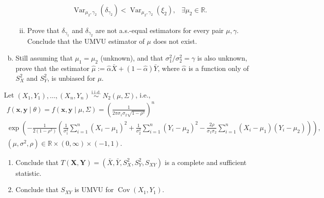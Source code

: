 \begin{ex}
\begin{enumerate}[(a)]
\begin{enumerate}[(i)]
\[\begin{array}{ll}
            \operatorname{Var}_{\mu_{2}, \gamma_{2}}\left(\delta_{\gamma_{2}}\right)<\operatorname{Var}_{\mu_{2}, \gamma_{2}}\left(\xi_{2}\right), & \exists \mu_{2} \in \mathbb{R}. 
            \end{array}
            \]
            \item Prove that \(\delta_{\gamma_{1}}\) and \(\delta_{\gamma_{2}}\) are not a.s.-equal estimators for every pair \(\mu, \gamma\). Conclude that the UMVU estimator of \(\mu\) does not exist. 
        \end{enumerate}
        \item Still assuming that \(\mu_{1}=\mu_{2}\) (unknown), and that \(\sigma_{1}^{2} / \sigma_{2}^{2}=\gamma\) is also unknown, prove that the estimator \(\widehat{\mu}:=\widehat{\alpha} \bar{X}+(1-\widehat{\alpha}) \bar{Y}\), where \(\widehat{\alpha}\) is a function only of \(S_{X}^{2}\) and \(S_{Y}^{2}\), is unbiased for \(\mu\). 
    \end{enumerate}
\end{ex}

\begin{ex}
    Let \(\left(X_{1}, Y_{1}\right), \ldots,\left(X_{n}, Y_{n}\right) \stackrel{\text { i.i.d. }}{\sim} N_{2}(\mu, \Sigma)\), i.e., 
    \[
    \begin{gathered}
    f(\mathbf{x}, \mathbf{y} \mid \theta)=f(\mathbf{x}, \mathbf{y} \mid \mu, \Sigma)=\left(\frac{1}{2 \pi \sigma_{1} \sigma_{2} \sqrt{1-\rho^{2}}}\right)^{n} \\
    \exp \left(-\frac{1}{2\left(1-\rho^{2}\right)}\left(\frac{1}{\sigma_{1}^{2}} \sum_{i=1}^{n}\left(X_{i}-\mu_{1}\right)^{2}+\frac{1}{\sigma_{2}^{2}} \sum_{i=1}^{n}\left(Y_{i}-\mu_{2}\right)^{2}-\frac{2 \rho}{\sigma_{1} \sigma_{2}} \sum_{i=1}^{n}\left(X_{i}-\mu_{1}\right)\left(Y_{i}-\mu_{2}\right)\right)\right), \\
    \left(\mu, \sigma^{2}, \rho\right) \in \mathbb{R} \times(0, \infty) \times(-1,1) .
    \end{gathered}
    \]
    \begin{enumerate}
        \item Conclude that \(T(\mathbf{X}, \mathbf{Y})=\left(\bar{X}, \bar{Y}, S_{X}^{2}, S_{Y}^{2}, S_{X Y}\right)\) is a complete and sufficient statistic. 
        \item Conclude that \(S_{X Y}\) is UMVU for \(\operatorname{Cov}\left(X_{1}, Y_{1}\right)\). 
    \end{enumerate}
\end{ex}

